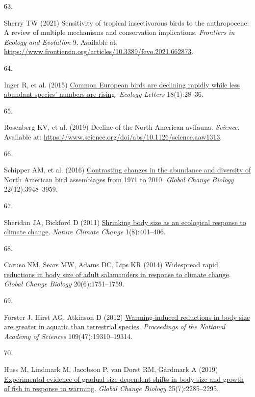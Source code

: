 \documentclass{article}
\newlength{\cslhangindent}
\newlength{\csllabelwidth}
\newlength{\cslentryspacingunit} %
\newenvironment{CSLReferences}[2] %
 {%
  \setlength{\parindent}{0pt}
  \ifodd #1
  \let\oldpar\par
  \def\par{\hangindent=\cslhangindent\oldpar}
  \fi
  \setlength{\parskip}{#2\cslentryspacingunit}
 }%
 {}
\newcommand{\CSLLeftMargin}[1]{\parbox[t]{\csllabelwidth}{#1}}
\newcommand{\CSLRightInline}[1]{\parbox[t]{\linewidth - \csllabelwidth}{#1}\break}
\begin{document}
\begin{CSLReferences}{0}{0}
\leavevmode{}%
\CSLLeftMargin{63. }%
\CSLRightInline{Sherry TW (2021) Sensitivity of tropical insectivorous
birds to the anthropocene: A review of multiple mechanisms and
conservation implications. \emph{Frontiers in Ecology and Evolution} 9.
Available at:
\url{https://www.frontiersin.org/articles/10.3389/fevo.2021.662873}.}

\leavevmode{}%
\CSLLeftMargin{64. }%
\CSLRightInline{Inger R, et al. (2015)
\href{https://doi.org/10.1111/ele.12387}{Common European birds are
declining rapidly while less abundant species' numbers are rising}.
\emph{Ecology Letters} 18(1):28--36.}

\leavevmode{}%
\CSLLeftMargin{65. }%
\CSLRightInline{Rosenberg KV, et al. (2019) Decline of the North
American avifauna. \emph{Science}. Available at:
\url{https://www.science.org/doi/abs/10.1126/science.aaw1313}.}

\leavevmode{}%
\CSLLeftMargin{66. }%
\CSLRightInline{Schipper AM, et al. (2016)
\href{https://doi.org/10.1111/gcb.13292}{Contrasting changes in the
abundance and diversity of North American bird assemblages from 1971 to
2010}. \emph{Global Change Biology} 22(12):3948--3959.}

\leavevmode{}%
\CSLLeftMargin{67. }%
\CSLRightInline{Sheridan JA, Bickford D (2011)
\href{https://doi.org/10.1038/nclimate1259}{Shrinking body size as an
ecological response to climate change}. \emph{Nature Climate Change}
1(8):401--406.}

\leavevmode{}%
\CSLLeftMargin{68. }%
\CSLRightInline{Caruso NM, Sears MW, Adams DC, Lips KR (2014)
\href{https://doi.org/10.1111/gcb.12550}{Widespread rapid reductions in
body size of adult salamanders in response to climate change}.
\emph{Global Change Biology} 20(6):1751--1759.}

\leavevmode{}%
\CSLLeftMargin{69. }%
\CSLRightInline{Forster J, Hirst AG, Atkinson D (2012)
\href{https://doi.org/10.1073/pnas.1210460109}{Warming-induced
reductions in body size are greater in aquatic than terrestrial
species}. \emph{Proceedings of the National Academy of Sciences}
109(47):19310--19314.}

\leavevmode{}%
\CSLLeftMargin{70. }%
\CSLRightInline{Huss M, Lindmark M, Jacobson P, van Dorst RM, Gårdmark A
(2019) \href{https://doi.org/10.1111/gcb.14637}{Experimental evidence of
gradual size-dependent shifts in body size and growth of fish in
response to warming}. \emph{Global Change Biology} 25(7):2285--2295.}


\end{CSLReferences}
\end{document}

